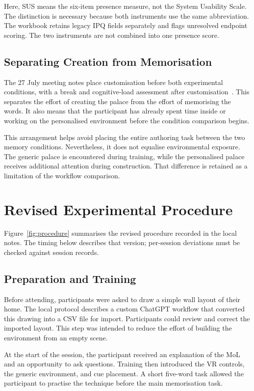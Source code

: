 Here, SUS means the six-item presence measure, not the System Usability Scale. The distinction is necessary because both instruments use the same abbreviation. The workbook retains legacy IPQ fields separately and flags unresolved endpoint scoring. The two instruments are not combined into one presence score.

\subsection{Separating Creation from Memorisation}
The 27 July meeting notes place customisation before both experimental conditions, with a break and cognitive-load assessment after customisation~\cite{meetingjuly27}. This separates the effort of creating the palace from the effort of memorising the words. It also means that the participant has already spent time inside or working on the personalised environment before the condition comparison begins.

This arrangement helps avoid placing the entire authoring task between the two memory conditions. Nevertheless, it does not equalise environmental exposure. The generic palace is encountered during training, while the personalised palace receives additional attention during construction. That difference is retained as a limitation of the workflow comparison.

\section{Revised Experimental Procedure}
Figure~\ref{fig:procedure} summarises the revised procedure recorded in the local notes. The timing below describes that version; per-session deviations must be checked against session records.

\subsection{Preparation and Training}
Before attending, participants were asked to draw a simple wall layout of their home. The local protocol describes a custom ChatGPT workflow that converted this drawing into a CSV file for import. Participants could review and correct the imported layout. This step was intended to reduce the effort of building the environment from an empty scene.

At the start of the session, the participant received an explanation of the MoL and an opportunity to ask questions. Training then introduced the VR controls, the generic environment, and cue placement. A short five-word task allowed the participant to practise the technique before the main memorisation task.

